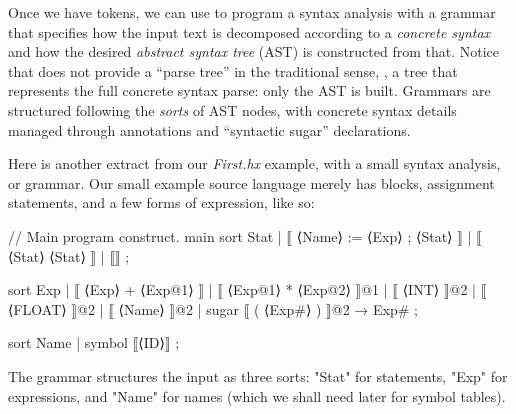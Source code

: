 \documentclass[11pt]{article} %
\begin{document}
Once we have tokens, we can use \HAX to program a syntax analysis with a grammar that specifies how
the input text is decomposed according to a \emph{concrete syntax} and how the desired
\emph{abstract syntax tree} (AST) is constructed from that. Notice that \HAX does not provide a
``parse tree'' in the traditional sense, \ie, a tree that represents the full concrete syntax parse:
only the AST is built.  Grammars are structured following the \emph{sorts} of AST nodes, with
concrete syntax details managed through annotations and ``syntactic sugar'' declarations.

\begin{example}\label{ex:syntax}
  Here is another extract from our \emph{First.hx} example, with a small syntax analysis, or
  grammar. Our small example source language merely has blocks, assignment statements, and a few
  forms of expression, like so:
\begin{hacs}[xleftmargin=\parindent,xrightmargin=\parindent,numbers=right]
// Main program construct.
main sort Stat  | ⟦ ⟨Name⟩ := ⟨Exp⟩ ; ⟨Stat⟩ ⟧
                | ⟦ { ⟨Stat⟩ } ⟨Stat⟩ ⟧
                | ⟦⟧ ;

sort Exp  | ⟦ ⟨Exp⟩ + ⟨Exp@1⟩ ⟧
          | ⟦ ⟨Exp@1⟩ * ⟨Exp@2⟩ ⟧@1
          | ⟦ ⟨INT⟩ ⟧@2
          | ⟦ ⟨FLOAT⟩ ⟧@2
          | ⟦ ⟨Name⟩ ⟧@2
          | sugar ⟦ ( ⟨Exp#⟩ ) ⟧@2 → Exp# ;

sort Name | symbol ⟦⟨ID⟩⟧ ;
\end{hacs}
  The grammar structures the input as three sorts: "Stat" for statements, "Exp" for expressions, and
  "Name" for names (which we shall need later for symbol tables).
\end{example}
\end{document}
